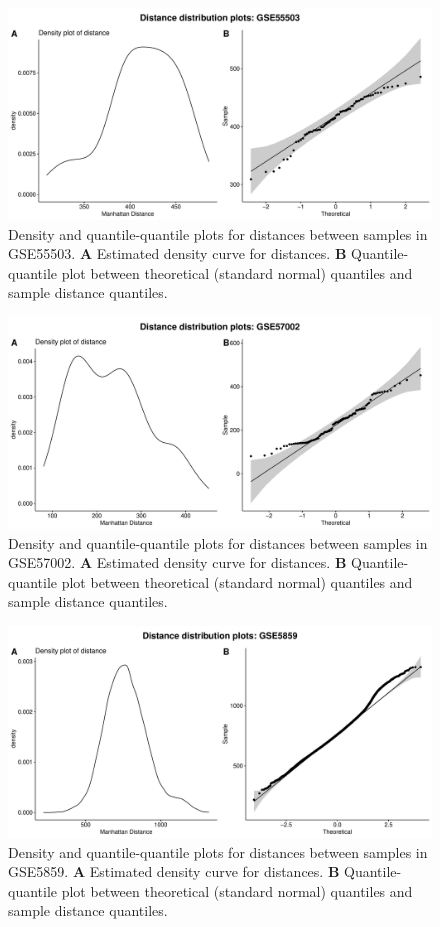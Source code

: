 \documentclass[10pt,letterpaper]{article}\usepackage[]{graphicx}\usepackage[]{color}
\begin{document}
\begin{figure}[H]
	\includegraphics[width=\textwidth]{manhattan-distance_hist_GSE55503.pdf}
	\caption{Density and quantile-quantile plots for distances between samples in GSE55503. \textbf{A} Estimated density curve for distances. \textbf{B} Quantile-quantile plot between theoretical (standard normal) quantiles and sample distance quantiles.}
\end{figure}

\begin{figure}[H]
	\includegraphics[width=\textwidth]{manhattan-distance_hist_GSE57002.pdf}
	\caption{Density and quantile-quantile plots for distances between samples in GSE57002. \textbf{A} Estimated density curve for distances. \textbf{B} Quantile-quantile plot between theoretical (standard normal) quantiles and sample distance quantiles.}
\end{figure}

\begin{figure}[H]
	\includegraphics[width=\textwidth]{manhattan-distance_hist_GSE5859.pdf}
	\caption{Density and quantile-quantile plots for distances between samples in GSE5859. \textbf{A} Estimated density curve for distances. \textbf{B} Quantile-quantile plot between theoretical (standard normal) quantiles and sample distance quantiles.}
\end{figure}
\end{document}
